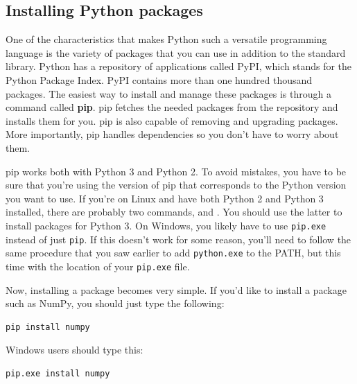 \subsection{Installing Python packages}\label{subsec:installing-python-packages2}\label{subsec:installing-python-packages}
One of the characteristics that makes Python such a versatile programming language is the variety of packages that you can use in addition to the standard library. Python has a repository of applications called PyPI, which stands for the Python Package Index. PyPI contains more than one hundred thousand packages. The easiest way to install and manage these packages is through a command called \textbf{pip}. pip fetches the needed packages from the repository and installs them for you. pip is also capable of removing and upgrading packages. More importantly, pip handles dependencies so you don't have to worry about them.

pip works both with Python 3 and Python 2. To avoid mistakes, you have to be sure that you're using the version of pip that corresponds to the Python version you want to use. If you're on Linux and have both Python 2 and Python 3 installed, there are probably two commands,  and . You should use the latter to install packages for Python 3. On Windows, you likely have to use \texttt{pip.exe} instead of just \texttt{pip}. If this doesn't work for some reason, you'll need to follow the same procedure that you saw earlier to add \texttt{python.exe} to the PATH, but this time with the location of your \texttt{pip.exe} file.


Now, installing a package becomes very simple. If you'd like to install a package such as NumPy, you should just type the following:
\begin{verbatim}
pip install numpy
\end{verbatim}

Windows users should type this:
\begin{verbatim}
pip.exe install numpy
\end{verbatim}


